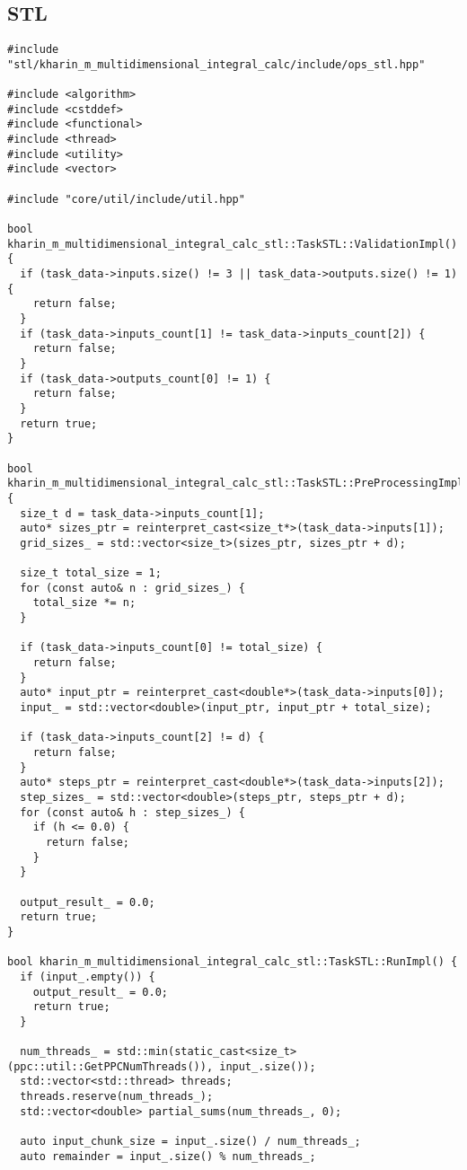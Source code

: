 \documentclass[12pt]{article}
\begin{document}
\subsection*{STL}
\begin{lstlisting}
#include "stl/kharin_m_multidimensional_integral_calc/include/ops_stl.hpp"

#include <algorithm>
#include <cstddef>
#include <functional>
#include <thread>
#include <utility>
#include <vector>

#include "core/util/include/util.hpp"

bool kharin_m_multidimensional_integral_calc_stl::TaskSTL::ValidationImpl() {
  if (task_data->inputs.size() != 3 || task_data->outputs.size() != 1) {
    return false;
  }
  if (task_data->inputs_count[1] != task_data->inputs_count[2]) {
    return false;
  }
  if (task_data->outputs_count[0] != 1) {
    return false;
  }
  return true;
}

bool kharin_m_multidimensional_integral_calc_stl::TaskSTL::PreProcessingImpl() {
  size_t d = task_data->inputs_count[1];
  auto* sizes_ptr = reinterpret_cast<size_t*>(task_data->inputs[1]);
  grid_sizes_ = std::vector<size_t>(sizes_ptr, sizes_ptr + d);

  size_t total_size = 1;
  for (const auto& n : grid_sizes_) {
    total_size *= n;
  }

  if (task_data->inputs_count[0] != total_size) {
    return false;
  }
  auto* input_ptr = reinterpret_cast<double*>(task_data->inputs[0]);
  input_ = std::vector<double>(input_ptr, input_ptr + total_size);

  if (task_data->inputs_count[2] != d) {
    return false;
  }
  auto* steps_ptr = reinterpret_cast<double*>(task_data->inputs[2]);
  step_sizes_ = std::vector<double>(steps_ptr, steps_ptr + d);
  for (const auto& h : step_sizes_) {
    if (h <= 0.0) {
      return false;
    }
  }

  output_result_ = 0.0;
  return true;
}

bool kharin_m_multidimensional_integral_calc_stl::TaskSTL::RunImpl() {
  if (input_.empty()) {
    output_result_ = 0.0;
    return true;
  }

  num_threads_ = std::min(static_cast<size_t>(ppc::util::GetPPCNumThreads()), input_.size());
  std::vector<std::thread> threads;
  threads.reserve(num_threads_);
  std::vector<double> partial_sums(num_threads_, 0);

  auto input_chunk_size = input_.size() / num_threads_;
  auto remainder = input_.size() % num_threads_;


\end{lstlisting}
\end{document}
